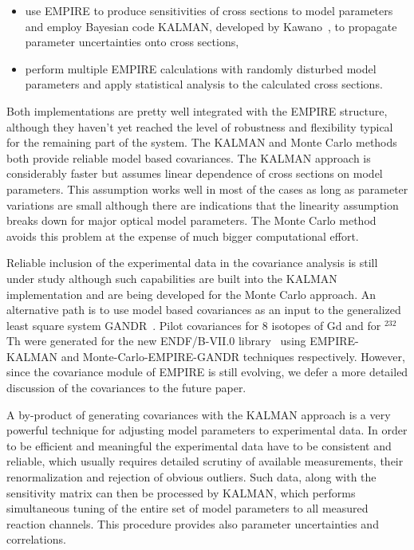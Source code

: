 \begin{itemize}
\item use EMPIRE to produce sensitivities of cross sections to model
parameters and employ Bayesian code KALMAN, developed by Kawano~\cite%
{Kawano:97}, to propagate parameter uncertainties onto cross sections,

\item perform multiple EMPIRE calculations with randomly disturbed model
parameters and apply statistical analysis to the calculated cross sections.
\end{itemize}

Both implementations are pretty well integrated with the EMPIRE structure,
although they haven't yet reached the level of robustness and flexibility
typical for the remaining part of the system. The KALMAN and Monte Carlo
methods both provide reliable model based covariances. The KALMAN approach
is considerably faster but assumes linear dependence of cross sections on
model parameters. This assumption works well in most of the cases as long as
parameter variations are small although there are indications that the
linearity assumption breaks down for major optical model parameters. The
Monte Carlo method avoids this problem at the expense of much bigger
computational effort.

Reliable inclusion of the experimental data in the covariance analysis is
still under study although such capabilities are built into the KALMAN
implementation and are being developed for the Monte Carlo approach. An
alternative path is to use model based covariances as an input to the
generalized least square system GANDR~\cite{GANDR}. Pilot covariances for 8
isotopes of Gd and for $^{232}$Th were generated for the new ENDF/B-VII.0
library~\cite{ENDF-VII} using EMPIRE-KALMAN and Monte-Carlo-EMPIRE-GANDR
techniques respectively. However, since the covariance module of EMPIRE is
still evolving, we defer a more detailed discussion of the covariances to
the future paper.

A by-product of generating covariances with the KALMAN approach is a very
powerful technique for adjusting model parameters to experimental data. In
order to be efficient and meaningful the experimental data have to be
consistent and reliable, which usually requires detailed scrutiny of
available measurements, their renormalization and rejection of obvious
outliers. Such data, along with the sensitivity matrix can then be processed
by KALMAN, which performs simultaneous tuning of the entire set of model
parameters to all measured reaction channels. This procedure provides also
parameter uncertainties and correlations.


